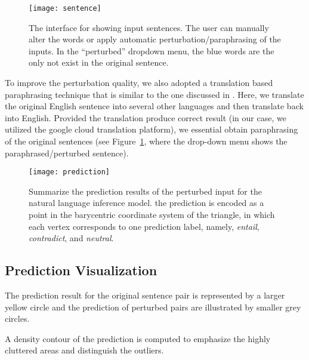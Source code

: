 \begin{figure}[htbp]
\centering
\vspace{-2mm}
 \texttt{[image: sentence]}
 \caption{
The interface for showing input sentences. The user can manually alter the words or apply automatic perturbation/paraphrasing of the inputs. In the ``perturbed'' dropdown menu, the blue words are the only not exist in the original sentence.
 }
\label{fig:sentence}
\end{figure}

To improve the perturbation quality, we also adopted a translation based paraphrasing technique that is similar to the one discussed in \cite{mallinson2017paraphrasing}. Here, we translate the original English sentence into several other languages and then translate back into English. Provided the translation produce correct result (in our case, we utilized the google cloud translation platform), we essential obtain paraphrasing of the original sentences (see Figure~\ref{fig:sentence}, where the drop-down menu shows the paraphrased/perturbed sentence).

\begin{figure}[htbp]
\centering
\vspace{-2mm}
 \texttt{[image: prediction]}
 \caption{
Summarize the prediction results of the perturbed input for the natural language inference model.
the prediction is encoded as a point in the barycentric coordinate system of the triangle, in which each vertex corresponds to one prediction label, namely, \emph{entail}, \emph{contradict}, and \emph{neutral}.
}
\label{fig:prediction}
\end{figure}


\subsection{Prediction Visualization}

The prediction result for the original sentence pair is represented by a larger yellow circle and the prediction of perturbed pairs are illustrated by smaller grey circles.

A density contour of the prediction is computed to emphasize the highly cluttered areas and distinguish the outliers.


